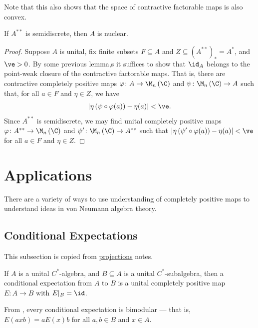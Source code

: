 \documentclass[10pt]{mypackage}
\begin{document}
Note that this also shows that the space of contractive factorable maps is also convex.
\begin{proposition}
  If $A^{\ast\ast}$ is semidiscrete, then $A$ is nuclear.
\end{proposition}
\begin{proof}
  Suppose $A$ is unital, fix finite subsets $ F\subseteq A $ and $ Z\subseteq \left( A^{\ast\ast} \right)_{\ast}=A^{\ast} $, and $\ve > 0$. By some previous lemma,s it suffices to show that $ \id_A $ belongs to the point-weak closure of the contractive factorable maps. That is, there are contractive completely positive maps $\varphi\colon A\rightarrow \M_n\left( \C \right)$ and $\psi\colon \M_n\left( \C \right)\rightarrow A$ such that, for all $a\in F$ and $\eta\in Z$, we have
  \begin{align*}
    \left\vert \eta\left( \psi\circ\varphi(a) \right)-\eta(a) \right\vert < \ve.
  \end{align*}
  Since $A^{\ast\ast}$ is semidiscrete, we may find unital completely positive maps $\varphi\colon A^{\ast\ast}\rightarrow \M_n\left( \C \right)$ and $\psi'\colon \M_n\left( \C \right)\rightarrow A^{\ast\ast}$ such that $\left\vert \eta\left( \psi'\circ\varphi(a) \right) - \eta(a) \right\vert < \ve$ for all $a\in F$ and $\eta\in Z$.
\end{proof}
\section{Applications}%
There are a variety of ways to use understanding of completely positive maps to understand ideas in von Neumann algebra theory.
\subsection{Conditional Expectations}%
This subsection is copied from \href{https://ai-bearing.github.io/Classes_and_Homework/After\%20College/Other\%20Notes/vna_projections.pdf}{projections} notes.
\begin{definition}
  If $A$ is a unital $C^{\ast}$-algebra, and $B\subseteq A$ is a unital $C^{\ast}$-subalgebra, then a conditional expectation from $A$ to $B$ is a unital completely positive map $E\colon A\rightarrow B$ with $E|_{B} = \id$. 
\end{definition}
From \cite[Corollary 3.19]{paulsen_completely_bounded_maps}, every conditional expectation is bimodular --- that is, $E\left( axb \right) = aE(x)b$ for all $a,b\in B$ and $x\in A$.
\end{document}
